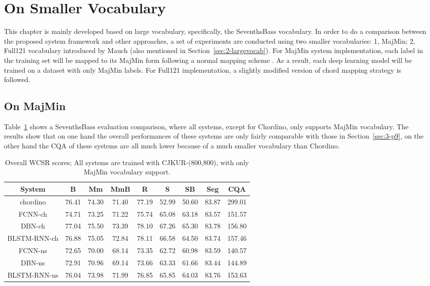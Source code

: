 \section{On Smaller Vocabulary}
This chapter is mainly developed based on large vocabulary, specifically, the SeventhsBass vocabulary. In order to do a comparison between the proposed system framework and other approaches, a set of experiments are conducted using two smaller vocabularies: 1, MajMin; 2, Full121 vocabulary introduced by Mauch \cite{mauch2010automatic} (also mentioned in Section~\ref{sec:2-largevocab}). For MajMin system implementation, each label in the training set will be mapped to its MajMin form following a normal mapping scheme \cite{harte2010towards,pauwels2013evaluating}. As a result, each deep learning model will be trained on a dataset with only MajMin labels. For Full121 implementation, a slightly modified version of chord mapping strategy \cite{mauch2010automatic} is followed.

\subsection{On MajMin}
Table~\ref{tab:3-overallres} shows a SeventhsBass evaluation comparison, where all systems, except for Chordino, only supports MajMin vocabulary. The results show that on one hand the overall performances of these systems are only fairly comparable with those in Section~\ref{sec:3-p9}, on the other hand the CQA of these systems are all much lower because of a much smaller vocabulary than Chordino.
\begin{table}[h]
\footnotesize
\centering
\caption{Overall WCSR scores; All systems are trained with CJKUR-(800,800), with only MajMin vocabulary support.}
\label{tab:3-overallres}
\begin{tabular}{|c|c|c|c|c|c|c|c|c|}\hline
System & B & Mm & MmB & R & S & SB & Seg & CQA \\ \hline
chordino & 76.41 & 74.30 & 71.40 & 77.19 & 52.99 & 50.60 & 83.87 & 299.01\\ \hline
FCNN-ch & 74.71 & 73.25 & 71.22 & 75.74 & 65.08 & 63.18 & 83.57 & 151.57\\ \hline
DBN-ch & 77.04 & 75.50 & 73.39 & 78.10 & 67.26 & 65.30 & 83.78 & 156.80\\ \hline
BLSTM-RNN-ch & 76.88 & 75.05 & 72.84 & 78.11 & 66.58 & 64.50 & 83.74 & 157.46\\ \hline
FCNN-ns & 72.65 & 70.00 & 68.14 & 73.35 & 62.72 & 60.98 & 83.59 & 140.57\\ \hline
DBN-ns & 72.91 & 70.96 & 69.14 & 73.66 & 63.33 & 61.66 & 83.44 & 144.89\\ \hline
BLSTM-RNN-ns & 76.04 & 73.98 & 71.99 & 76.85 & 65.85 & 64.03 & 83.76 & 153.63\\ \hline
\end{tabular}
\end{table}

